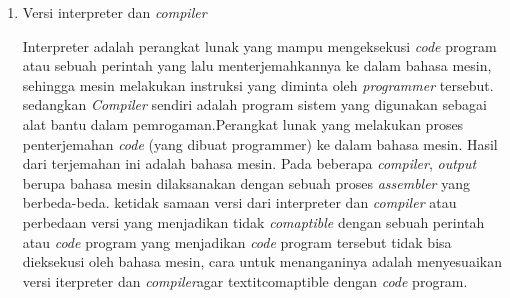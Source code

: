 \begin{enumerate}
\begin{enumerate}
\end{enumerate}
\item Versi interpreter dan \textit{compiler}
\par
Interpreter adalah perangkat lunak yang mampu mengeksekusi \textit{code} program atau sebuah perintah yang lalu menterjemahkannya ke dalam bahasa mesin, sehingga mesin melakukan instruksi yang diminta oleh \textit{programmer} tersebut. sedangkan \textit{Compiler} sendiri adalah program sistem yang digunakan sebagai alat bantu dalam pemrogaman.Perangkat lunak yang melakukan proses penterjemahan \textit{code} (yang dibuat programmer) ke dalam bahasa mesin. Hasil dari terjemahan ini adalah bahasa mesin. Pada beberapa \textit{compiler}, \textit{output} berupa bahasa mesin dilaksanakan dengan sebuah proses \textit{assembler} yang berbeda-beda. ketidak samaan versi dari interpreter dan \textit{compiler} atau perbedaan versi yang menjadikan tidak \textit{comaptible} dengan sebuah perintah atau \textit{code} program yang menjadikan \textit{code} program tersebut tidak bisa dieksekusi oleh bahasa mesin, cara untuk menanganinya adalah menyesuaikan versi iterpreter dan \textit{compiler}agar textit{comaptible} dengan \textit{code} program.
\end{enumerate}